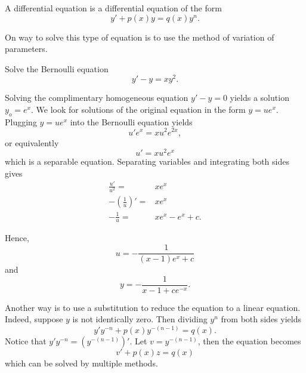 \begin{definition}
  A  differential equation is a differential equation of the form
	$$y' + p(x) y = q(x)y^n.$$
\end{definition}

On way to solve this type of equation is to use the method of variation of parameters.

\begin{example}
  Solve the Bernoulli equation
\[y'-y=xy^2.\]
\end{example}
\begin{solution}
  Solving the complimentary homogeneous equation $y'-y=0$ yields a solution $y_o=e^x$. We look for solutions of the original equation in the form $y=ue^x$.
  Plugging $y=ue^x$ into the Bernoulli equation yields
  \[u'e^x=xu^2e^{2x},\] 
  or equivalently
  \[u'=xu^2e^x\]
  which is a separable equation.
  Separating variables and integrating both sides gives
  \[
  \begin{aligned}
    \frac{u'}{u^2}=&xe^x\\
    -\left(\frac1u \right)'=&x e^x\\
    -\frac1u =&x e^x - e^x + c.
  \end{aligned}
  \]

  Hence,
\[u=-\frac{1}{(x-1)e^x+c}\]
and
\[y=-\frac{1}{x-1+ce^{-x}}.\]
\end{solution}

Another way is to use a substitution to reduce the equation to a linear equation. Indeed, suppose $y$ is not identically zero. Then dividing $y^n$ from both sides yields
\[ y'y^{-n}+p(x)y^{-(n-1)} = q(x).\]
Notice that $y' y^{-n}=\left(y^{-(n-1)}\right)'$. 
Let $v=y^{-(n-1)}$, then the equation becomes 
\[v' + p(x)z = q(x)\]
which can be solved by multiple methods.

